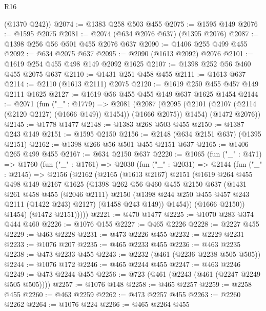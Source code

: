 \begin{lexlean}{R16}
\begin{coremodule}
      (@1370 @242))
@2074 := @1383 @258 @503 @455
@2075 := @1595 @149
@2076 := @1595 @2075
@2081 := @2074 (@634 @2076 @637) (@1395 @2076)
@2087 := @1398 @256 @56 @501 @455 @2076 @637
@2090 := @1406 @255 @499 @455
@2092 := @634 @2075 @637
@2095 := @2090 (@1613 @2092) @2076
@2101 := @1619 @254 @455 @498 @149 @2092 @1625
@2107 := @1398 @252 @56 @460 @455 @2075 @637
@2110 := @1431 @251 @458 @455
@2111 := @1613 @637
@2114 := @2110 (@1613 @2111) @2075
@2120 := @1619 @250 @455 @457 @149 @2111 @1625
@2127 := @1619 @56 @455 @455 @149 @637 @1625 @1454
@2144 := @2071
    (fun ("_" : @1779) =>
    @2081
      (@2087 (@2095 (@2101 (@2107 (@2114 (@2120 @2127) (@1666 @149)) @1454)) (@1666 @2075)) @1454)
      (@1472 @2076))
@2145 := @1778 @1477
@2148 := @1383 @268 @503 @455
@2150 := @1387 @243 @149
@2151 := @1595 @2150
@2156 := @2148 (@634 @2151 @637) (@1395 @2151)
@2162 := @1398 @266 @56 @501 @455 @2151 @637
@2165 := @1406 @265 @499 @455
@2167 := @634 @2150 @637
@2220 := @1065
    (fun ("_" : @471) =>
    @1760
      (fun ("_" : @1761) =>
      @2030
        (fun ("_" : @2031) =>
        @2144
          (fun ("_" : @2145) =>
          @2156
            (@2162
              (@2165
                (@1613 @2167)
                @2151
                (@1619
                  @264
                  @455
                  @498
                  @149
                  @2167
                  @1625
                  (@1398
                    @262
                    @56
                    @460
                    @455
                    @2150
                    @637
                    (@1431
                      @261
                      @458
                      @455
                      (@2046 @2111)
                      @2150
                      (@1398 @244 @250 @455 @457 @243 @2111 (@1422 @243) @2127)
                      (@1458 @243 @149))
                    @1454))
                (@1666 @2150))
              @1454)
            (@1472 @2151)))))
@2221 := @470 @1477
@2225 := @1070 @283 @374 @444 @460
@2226 := @1076 @155
@2227 := @465 @2226
@2228 := @2227 @455
@2229 := @463 @2228
@2231 := @473 @2226 @455
@2232 := @2229 @2231
@2233 := @1076 @207
@2235 := @465 @2233 @455
@2236 := @463 @2235
@2238 := @473 @2233 @455
@2243 := @2232 (@461 (@2236 @2238 @505 @505))
@2244 := @1076 @172
@2246 := @465 @2244 @455
@2247 := @463 @2246
@2249 := @473 @2244 @455
@2256 := @723 (@461 (@2243 (@461 (@2247 @2249 @505 @505))))
@2257 := @1076 @148
@2258 := @465 @2257
@2259 := @2258 @455
@2260 := @463 @2259
@2262 := @473 @2257 @455
@2263 := @2260 @2262
@2264 := @1076 @224
@2266 := @465 @2264 @455

\end{coremodule}
\end{lexlean}
